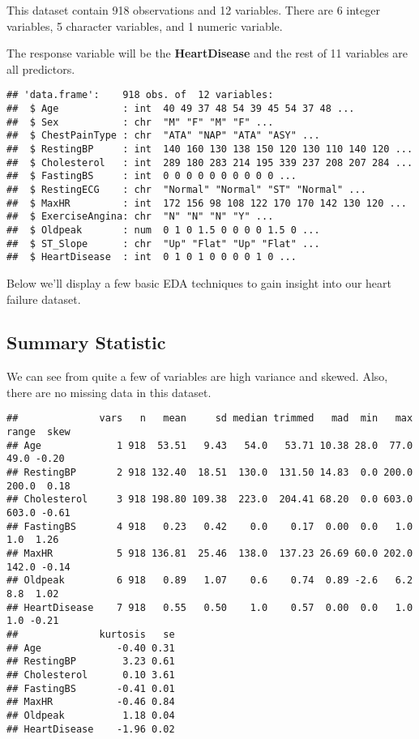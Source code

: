 \documentclass[
]{article}
\begin{document}
This dataset contain 918 observations and 12 variables. There are 6
integer variables, 5 character variables, and 1 numeric variable.

The response variable will be the \textbf{HeartDisease} and the rest of
11 variables are all predictors.

\begin{verbatim}
## 'data.frame':    918 obs. of  12 variables:
##  $ Age           : int  40 49 37 48 54 39 45 54 37 48 ...
##  $ Sex           : chr  "M" "F" "M" "F" ...
##  $ ChestPainType : chr  "ATA" "NAP" "ATA" "ASY" ...
##  $ RestingBP     : int  140 160 130 138 150 120 130 110 140 120 ...
##  $ Cholesterol   : int  289 180 283 214 195 339 237 208 207 284 ...
##  $ FastingBS     : int  0 0 0 0 0 0 0 0 0 0 ...
##  $ RestingECG    : chr  "Normal" "Normal" "ST" "Normal" ...
##  $ MaxHR         : int  172 156 98 108 122 170 170 142 130 120 ...
##  $ ExerciseAngina: chr  "N" "N" "N" "Y" ...
##  $ Oldpeak       : num  0 1 0 1.5 0 0 0 0 1.5 0 ...
##  $ ST_Slope      : chr  "Up" "Flat" "Up" "Flat" ...
##  $ HeartDisease  : int  0 1 0 1 0 0 0 0 1 0 ...
\end{verbatim}

Below we'll display a few basic EDA techniques to gain insight into our
heart failure dataset.

\subsection{Summary Statistic}\label{summary-statistic}

We can see from quite a few of variables are high variance and skewed.
Also, there are no missing data in this dataset.

\begin{verbatim}
##              vars   n   mean     sd median trimmed   mad  min   max range  skew
## Age             1 918  53.51   9.43   54.0   53.71 10.38 28.0  77.0  49.0 -0.20
## RestingBP       2 918 132.40  18.51  130.0  131.50 14.83  0.0 200.0 200.0  0.18
## Cholesterol     3 918 198.80 109.38  223.0  204.41 68.20  0.0 603.0 603.0 -0.61
## FastingBS       4 918   0.23   0.42    0.0    0.17  0.00  0.0   1.0   1.0  1.26
## MaxHR           5 918 136.81  25.46  138.0  137.23 26.69 60.0 202.0 142.0 -0.14
## Oldpeak         6 918   0.89   1.07    0.6    0.74  0.89 -2.6   6.2   8.8  1.02
## HeartDisease    7 918   0.55   0.50    1.0    0.57  0.00  0.0   1.0   1.0 -0.21
##              kurtosis   se
## Age             -0.40 0.31
## RestingBP        3.23 0.61
## Cholesterol      0.10 3.61
## FastingBS       -0.41 0.01
## MaxHR           -0.46 0.84
## Oldpeak          1.18 0.04
## HeartDisease    -1.96 0.02
\end{verbatim}
\end{document}
